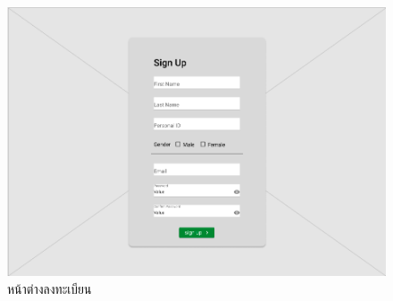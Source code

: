 \begin{enumerate}
        \begin{figure}[h]
          \begin{center}
            \includegraphics[width=\linewidth]{photo/student/register.png}
          \end{center}
          \caption{หน้าต่างลงทะเบียน}
          \label{fig:register}
        \end{figure}
        

\end{enumerate}
